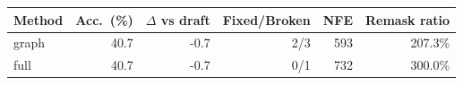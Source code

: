 \begin{tabular}{lrrrrr}
\toprule
Method & Acc.\ (\%) & $\Delta$ vs draft & Fixed/Broken & NFE & Remask ratio \\
\midrule
graph & 40.7 & -0.7 & 2/3 & 593 & 207.3\% \\
full & 40.7 & -0.7 & 0/1 & 732 & 300.0\% \\
\bottomrule
\end{tabular}
